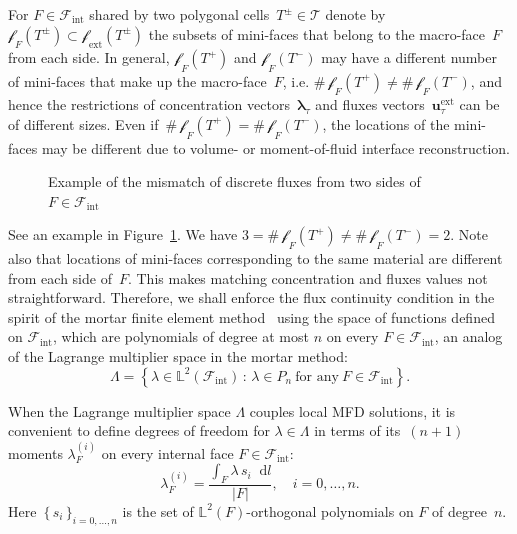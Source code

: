 \documentclass[12pt]{article}
\newcommand{\svginputw}[2][\linewidth]{\def\svgwidth{#1}} %
\newcommand{\vect}[1]{\boldsymbol{\mathbf{#1}}}
\newcommand{\bcell}{T}
\newcommand{\bmesh}{{\vect{\mathcal T}}}
\newcommand{\mmesh}{{\vect{\mathcal \tau}}}
\newcommand{\bfaces}[1][]{{\vect{\mathcal F}_{\text{#1}}}}
\newcommand{\mfaces}[1][]{{\vect{\mathcal f}_{\text{#1}}}}
\newcommand{\LTwoSpace}[1][\Omega]{{\mathbb L^2\left({#1}\right)}}
\newcommand*\diff{\mathop{}\!\mathrm{d}}
\begin{document}
	{\color{blue}For $F \in \bfaces[int]$ shared by two polygonal cells~$\bcell^\pm\in \bmesh$ denote by~$\mfaces_F(T^\pm) \subset \mfaces_{\text{ext}}(T^\pm)$ the subsets of mini-faces that belong to the macro-face~$F$ from each side. In general, $\mfaces_F(T^+)$ and $\mfaces_F(T^-)$ may have a different number of mini-faces that make up the macro-face~$F$, i.e. $\#\,\mfaces_F(T^+) \ne \#\,\mfaces_F(T^-)$, and hence the restrictions of concentration vectors~${\vect \lambda}_\mmesh$ and fluxes vectors~${\vect u}^\text{ext}_\mmesh$ can be of different sizes. Even if~$\#\,\mfaces_F(T^+) = \#\,\mfaces_F(T^-)$, the locations of the mini-faces may be different due to volume- or moment-of-fluid interface reconstruction.}
	\begin{figure}
		\begin{subfigure}{1\linewidth}
			\svginputw{e_plus_e_minus.pdf_tex}
		\end{subfigure}%
%			
		\caption{{\color{blue}Example of the mismatch of discrete fluxes from two sides of $F\in\bfaces[int]$}}
		\label{fig:mismatch}
	\end{figure}
{\color{blue}See an example in Figure~\ref{fig:mismatch}. We have $3 = \#\,\mfaces_F(T^+) \ne \#\,\mfaces_F(T^-) = 2$. Note also that locations of mini-faces corresponding to the same material are different from each side of~$F$}.	
	{\color{blue}This makes matching concentration and fluxes values not straightforward.} Therefore, we shall enforce the flux continuity condition in the spirit of the mortar finite element method~\cite{mortar} using the space of functions defined on $\bfaces[int]$, which are polynomials of degree at most $n$ on every $F\in\bfaces[int]$, an analog of the Lagrange multiplier space in the mortar method:
	\[
		\Lambda=\left\{\lambda\in \LTwoSpace[{\bfaces[int]}]\,:\, \lambda\in P_n~\text{for any}~F\in\bfaces[int]\right\}.
	\]

	When the Lagrange multiplier space $\Lambda$ couples local MFD solutions, it is convenient to define
	degrees of freedom for $\lambda\in\Lambda$ in terms of its~$(n+1)$ moments $\lambda^{(i)}_F$ on every internal face $F\in\bfaces[int]$:
	\begin{equation}\label{asc_dofs}
		\lambda^{(i)}_F=\frac{\int_F  \lambda\,s_i \diff l}{|F|}, \quad i = 0, \dots, n.
	\end{equation}
	Here~$\{\,s_i\,\}_{i=0,\dots,n}$ is the set of {\color{blue}$\LTwoSpace[F]$-orthogonal} polynomials on $F$ of degree~$n$.
	
\end{document}
